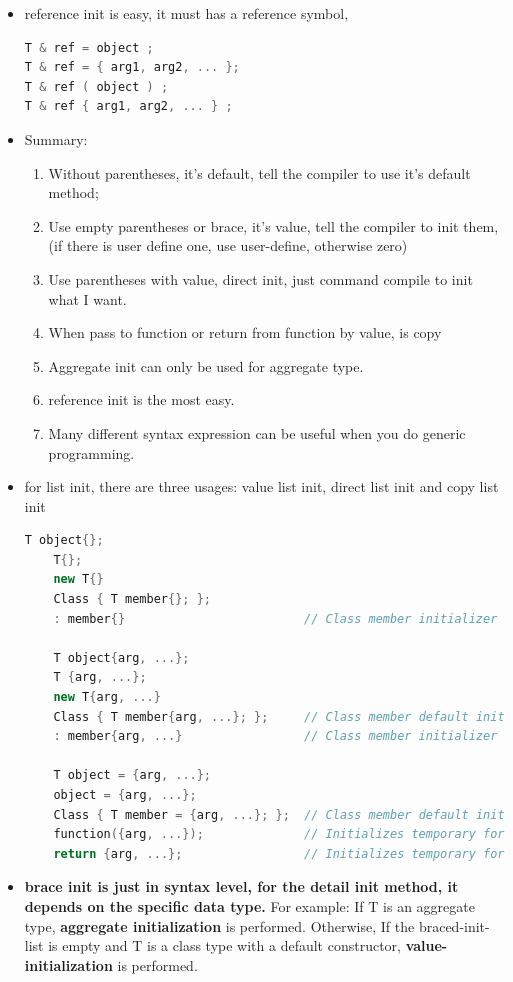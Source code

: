 \documentclass[a4paper,12pt,twoside]{book}
\begin{document}
\begin{itemize}
\item reference init is easy, it must has a reference symbol, 
\begin{lstlisting}[frame=single, language=c++]
T & ref = object ;
T & ref = { arg1, arg2, ... };
T & ref ( object ) ;
T & ref { arg1, arg2, ... } ;
\end{lstlisting}
	\item Summary:
\begin{enumerate}
	\item Without parentheses, it's default, tell the compiler to use it's default method;
	\item Use empty parentheses or brace, it's value, tell the compiler to init them, (if there is user define one, use user-define, otherwise zero)
	\item Use parentheses with value, direct init, just command compile to init what I want.
	\item When pass to function or return from function by value, is copy
	\item Aggregate init can only be used for aggregate type.
	\item reference init is the most easy.
	\item Many different syntax expression can be useful when you do generic programming.
\end{enumerate}
	
\item for list init, there are three usages: value list init, direct list init and copy list init
\begin{lstlisting}[frame=single, language=c++]
	T object{};
	T{};
	new T{}
	Class { T member{}; };
	: member{}                         // Class member initializer lists

	T object{arg, ...};
	T {arg, ...};
	new T{arg, ...}
	Class { T member{arg, ...}; };     // Class member default initializer
	: member{arg, ...}                 // Class member initializer lists
	
	T object = {arg, ...};
	object = {arg, ...};
	Class { T member = {arg, ...}; };  // Class member default initializer
	function({arg, ...});              // Initializes temporary for the function arg
	return {arg, ...};                 // Initializes temporary for return value
\end{lstlisting}
\item \textbf{brace init is just in syntax level, for the detail init method, it depends on the specific data type.}  For example: If T is an aggregate type, \textbf{aggregate initialization} is performed. Otherwise, If the braced-init-list is empty and T is a class type with a default constructor, \textbf{value-initialization} is performed.

\end{itemize}
\end{document}
